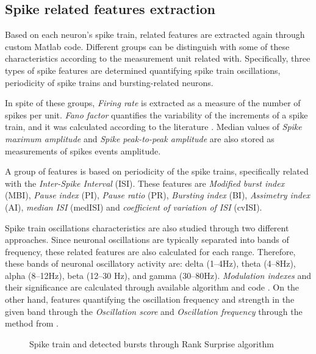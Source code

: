 \subsection{Spike related features extraction}

Based on each neuron's spike train, related features are extracted again through custom Matlab code. Different groups can be distinguish with some of these characteristics according to the measurement unit related with. Specifically, three types of spike features are determined quantifying spike train oscillations, periodicity of spike trains and bursting-related neurons. 

In spite of these groups, \textit{Firing rate} is extracted as a measure of the number of spikes per unit.  \textit{Fano factor} quantifies the variability of the increments of a spike train, and it was calculated according to the literature \cite{Llc2005}. Median values of \textit{Spike maximum amplitude} and \textit{Spike peak-to-peak amplitude} are also stored as measurements of spikes events amplitude. 
 
 A group of features is based on periodicity of the spike trains, specifically related with the \textit{Inter-Spike Interval} (ISI).
 These features are \textit{Modified burst index} (MBI), \textit{Pause index} (PI), \textit{Pause ratio} (PR), \textit{Bursting index} (BI), \textit{Assimetry index} (AI), \textit{median ISI} (medISI) and \textit{coefficient of variation of ISI} (cvISI).
 
 Spike train oscillations characteristics are also studied through two different approaches. Since neuronal oscillations are typically separated into bands of frequency, these related features are also calculated for each range. Therefore, these bands of neuronal oscillatory activity are: delta (1–4Hz), theta (4–8Hz), alpha (8–12Hz), beta (12–30 Hz), and gamma (30–80Hz). \textit{Modulation indexes} and their significance are calculated through available algorithm and code  . On the other hand, features quantifying the oscillation frequency and strength in the given band through the \textit{Oscillation score} and \textit{Oscillation frequency} through the method from .

\begin{figure}[!htb]
     \centering   

       \caption{Spike train and detected bursts through Rank Surprise algorithm}
     \label{fig:bursts}
\end{figure}  

